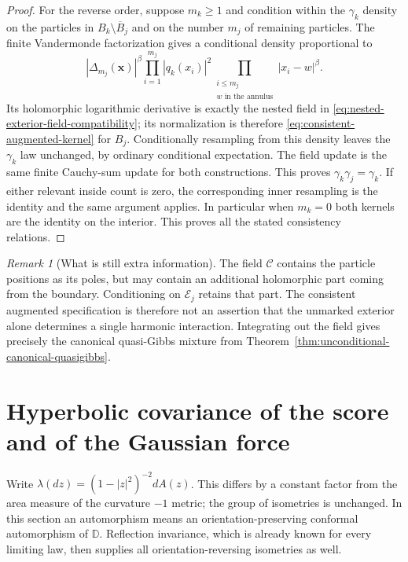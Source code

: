 \documentclass[11pt,a4paper]{article}
\numberwithin{equation}{section}
\theoremstyle{definition}
\theoremstyle{remark}
\newtheorem{remark}[theorem]{Remark}
\newcommand{\D}{\mathbb D}
\begin{document}
\begin{proof}
For the reverse order, suppose $m_k\ge1$ and condition within the
$\gamma_k$ density on the particles in $B_k\setminus\overline B_j$
and on the number $m_j$ of remaining particles. The finite
Vandermonde factorization gives a conditional density proportional to
\[
 |\Delta_{m_j}(\mathbf x)|^\beta
       \prod_{i=1}^{m_j}|q_k(x_i)|^2
       \prod_{\substack{i\le m_j\\ w\text{ in the annulus}}}
                                                   |x_i-w|^\beta.
\]
Its holomorphic logarithmic derivative is exactly the nested field
in \eqref{eq:nested-exterior-field-compatibility}; its normalization
is therefore \eqref{eq:consistent-augmented-kernel} for $B_j$.
Conditionally resampling from this density leaves the $\gamma_k$
law unchanged, by ordinary conditional expectation. The field update
is the same finite Cauchy-sum update for both constructions. This
proves $\gamma_k\gamma_j=\gamma_k$. If either relevant inside count
is zero, the corresponding inner resampling is the identity and the
same argument applies. In particular when $m_k=0$ both kernels are
the identity on the interior. This proves all the stated consistency
relations.
\end{proof}

\begin{remark}[What is still extra information]
The field $\mathcal C$ contains the particle positions as its poles,
but may contain an additional holomorphic part coming from the
boundary. Conditioning on $\mathcal E_j$ retains that part. The
consistent augmented specification is therefore not an assertion that
the unmarked exterior alone determines a single harmonic interaction.
Integrating out the field gives precisely the canonical quasi-Gibbs
mixture from Theorem~\ref{thm:unconditional-canonical-quasigibbs}.
\end{remark}

\section{Hyperbolic covariance of the score and of the Gaussian force}
\label{sec:hyperbolic-score-covariance}

Write $\lambda(dz)=(1-|z|^2)^{-2}dA(z)$. This differs by a
constant factor from the area measure of the curvature $-1$ metric;
the group of isometries is unchanged. In this section an automorphism
means an orientation-preserving conformal automorphism of $\D$.
Reflection invariance, which is already known for every limiting law,
then supplies all orientation-reversing isometries as well.
\end{document}
